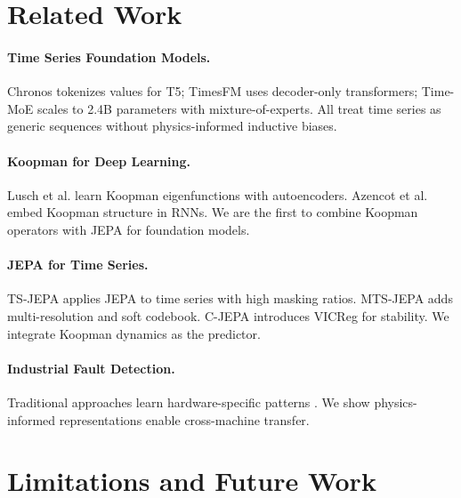 \documentclass{article}
\begin{document}
\section{Related Work}

\paragraph{Time Series Foundation Models.} Chronos \cite{chronos} tokenizes values for T5; TimesFM \cite{timesfm} uses decoder-only transformers; Time-MoE \cite{timemoe} scales to 2.4B parameters with mixture-of-experts. All treat time series as generic sequences without physics-informed inductive biases.

\paragraph{Koopman for Deep Learning.} Lusch et al. \cite{koopman_deep} learn Koopman eigenfunctions with autoencoders. Azencot et al. \cite{koopman_rnn} embed Koopman structure in RNNs. We are the first to combine Koopman operators with JEPA for foundation models.

\paragraph{JEPA for Time Series.} TS-JEPA \cite{tsjepa} applies JEPA to time series with high masking ratios. MTS-JEPA \cite{mtsjepa} adds multi-resolution and soft codebook. C-JEPA \cite{cjepa} introduces VICReg for stability. We integrate Koopman dynamics as the predictor.

\paragraph{Industrial Fault Detection.} Traditional approaches learn hardware-specific patterns \cite{cwru, cmapss}. We show physics-informed representations enable cross-machine transfer.

\section{Limitations and Future Work}
\end{document}
